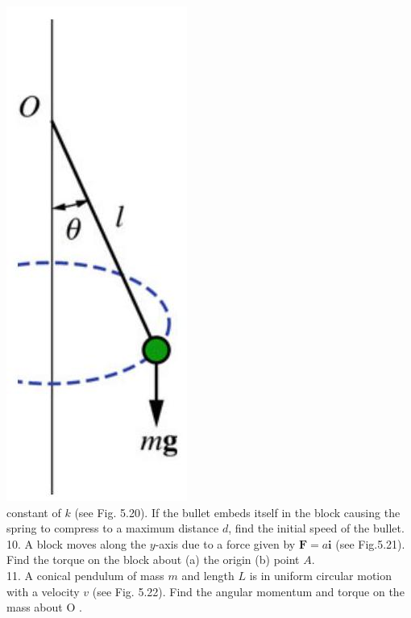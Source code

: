 \documentclass[10pt]{article}
\begin{document}
\includegraphics[max width=\textwidth, center]{2024_09_13_db1f357d2aad0a03eb2eg-093(2)}\\
constant of $k$ (see Fig. 5.20). If the bullet embeds itself in the block causing the spring to compress to a maximum distance $d$, find the initial speed of the bullet.\\
10. A block moves along the $y$-axis due to a force given by $\mathbf{F}=a \mathbf{i}$ (see Fig.5.21). Find the torque on the block about (a) the origin (b) point $A$.\\
11. A conical pendulum of mass $m$ and length $L$ is in uniform circular motion with a velocity $v$ (see Fig. 5.22). Find the angular momentum and torque on the mass about O .
\end{document}
